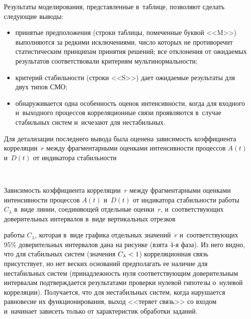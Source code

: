 \begin{multicols}{2}
     
     Результаты моделирования, представленные в~таблице, позволяют сделать 
следующие выводы:
     \begin{itemize}
\item принятые предположения (строки таб\-ли\-цы, помеченные буквой <<M>>) 
выполняются за редкими исключениями, чис\-ло которых не противоречит 
статистическим принципам принятия решений; все отклонения от ожи\-да\-емых 
результатов соответствовали критериям муль\-ти\-нор\-маль\-ности; 
\item критерий стабильности (строки <<S>>) дает ожи\-да\-емые результаты для двух 
типов СМО;
\item обнаруживается одна особенность оценок интенсивности, когда для 
входного и~выходного процессов корреляционные связи проявляются в~случае 
стабильных сис\-тем и~исчезают для нестабильных.
\end{itemize}




     
     Для детализации последнего вывода была оценена за\-ви\-си\-мость 
коэффициента корреляции~$r$ между фрагментарными оценками ин\-тен\-сив\-ности 
процессов $A(t)$ и~$D(t)$ от индикатора ста\-биль\-ности\linebreak\vspace*{-12pt}

{ \begin{center}  %
 \vspace*{6pt}
    \mbox{%
\epsfxsize=78.056mm 
}

\end{center}



\noindent
{{\small Зависимость коэффициента корреляции~$r$ между фрагментарными оценками 
интенсивности процессов $A(t)$ и~$D(t)$ от индикатора ста\-биль\-ности работы~$C_\lambda$ 
в~виде линии, соединяющей отдельные оценки~$r$, и~со\-от\-вет\-ст\-ву\-ющих доверительных 
интервалов в~виде вертикальных отрезков}}
}


\noindent
 работы $C_\lambda$, 
которая в~виде графика отдельных значений~$r$ и~со\-от\-вет\-ст\-ву\-ющих 95\% 
доверительных интервалов дана на рисунке (взята 4-я фаза). Из него вид\-но, что 
для стабильных сис\-тем (значения $C_\lambda\hm<1$) корреляционная связь 
присутствует, но нет вес\-ких оснований предполагать ее наличие для нестабильных 
сис\-тем (при\-над\-леж\-ность нуля со\-от\-вет\-ст\-ву\-ющим доверительным интервалам 
под\-тверж\-да\-ет\-ся результатами проверки нулевой гипотезы о~нулевой корреляции). 
Получается, что для нестабильных сис\-тем, когда нарушается равновесие их 
функционирования, выход <<теряет связь>> со входом и~начинает зависеть только 
от характеристик обработки заданий.


\end{multicols}
